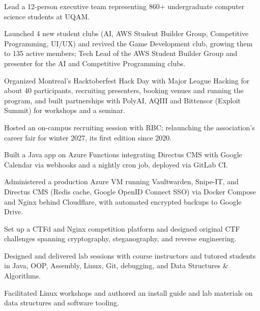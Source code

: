 \documentclass[letterpaper,10pt]{article}
\begin{document}
\begin{resume_list}
\item Lead a 12-person executive team representing 860+ undergraduate computer science students at UQAM.
\item Launched 4 new student clubs (AI, AWS Student Builder Group, Competitive Programming, UI/UX) and revived the Game Development club, growing them to 135 active members; Tech Lead of the AWS Student Builder Group and presenter for the AI and Competitive Programming clubs.
\item Organized Montreal's Hacktoberfest Hack Day with Major League Hacking for about 40 participants, recruiting presenters, booking venues and running the program, and built partnerships with PolyAI, AQIII and Bittensor (Exploit Summit) for workshops and a seminar.
\item Hosted an on-campus recruiting session with RBC; relaunching the association's career fair for winter 2027, its first edition since 2020.
\end{resume_list}

\begin{resume_list}
\item Built a Java app on Azure Functions integrating Directus CMS with Google Calendar via webhooks and a nightly cron job, deployed via GitLab CI.
\item Administered a production Azure VM running Vaultwarden, Snipe-IT, and Directus CMS (Redis cache, Google OpenID Connect SSO) via Docker Compose and Nginx behind Cloudflare, with automated encrypted backups to Google Drive.
\item Set up a CTFd and Nginx competition platform and designed original CTF challenges spanning cryptography, steganography, and reverse engineering. {\footnotesize {}}
\end{resume_list}

\begin{resume_list}
\item Designed and delivered lab sessions with course instructors and tutored students in Java, OOP, Assembly, Linux, Git, debugging, and Data Structures \& Algorithms.
\item Facilitated Linux workshops and authored an install guide and lab materials on data structures and software tooling. {\footnotesize {} }
\end{resume_list}
\end{document}
